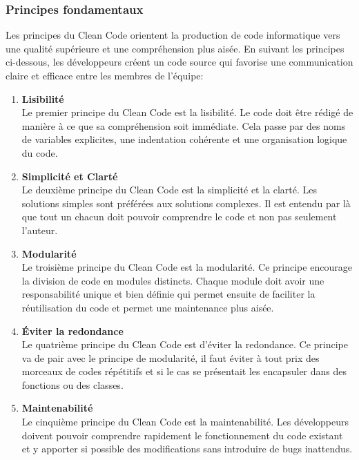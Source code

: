 \documentclass{rapport}
\begin{document}
\subsubsection{Principes fondamentaux}
Les principes du Clean Code orientent la production de code informatique vers une qualité supérieure et une compréhension plus aisée. En suivant les principes ci-dessous, les développeurs créent un code source qui favorise une communication claire et efficace entre les membres de l'équipe:\\
\begin{enumerate}[listparindent=0pt, parsep=0pt]

    \item \textbf{Lisibilité}\\
    Le premier principe du Clean Code est la lisibilité. Le code doit être rédigé de manière à ce que sa compréhension soit immédiate. Cela passe par des noms de variables explicites, une indentation cohérente et une organisation logique du code.\\
    
    \item \textbf{Simplicité et Clarté}\\
    Le deuxième principe du Clean Code est la simplicité et la clarté. Les solutions simples sont préférées aux solutions complexes. Il est entendu par là que tout un chacun doit pouvoir comprendre le code et non pas seulement l'auteur.\\
    
    \item \textbf{Modularité} \\
    Le troisième principe du Clean Code est la modularité. Ce principe encourage la division de code en modules distincts. Chaque module doit avoir une responsabilité unique et bien définie qui permet ensuite de faciliter la réutilisation du code et permet une maintenance plus aisée.\\
    
    \item \textbf{Éviter la redondance}\\
    Le quatrième principe du Clean Code est d'éviter la redondance. Ce principe va de pair avec le principe de modularité, il faut éviter à tout prix des morceaux de codes répétitifs et si le cas se présentait les encapsuler dans des fonctions ou des classes.\\
    
    \item \textbf{Maintenabilité}\\
    Le cinquième principe du Clean Code est la maintenabilité. Les développeurs doivent pouvoir comprendre rapidement le fonctionnement du code existant et y apporter si possible des modifications sans introduire de bugs inattendus.\\
    

\end{enumerate}
\end{document}
